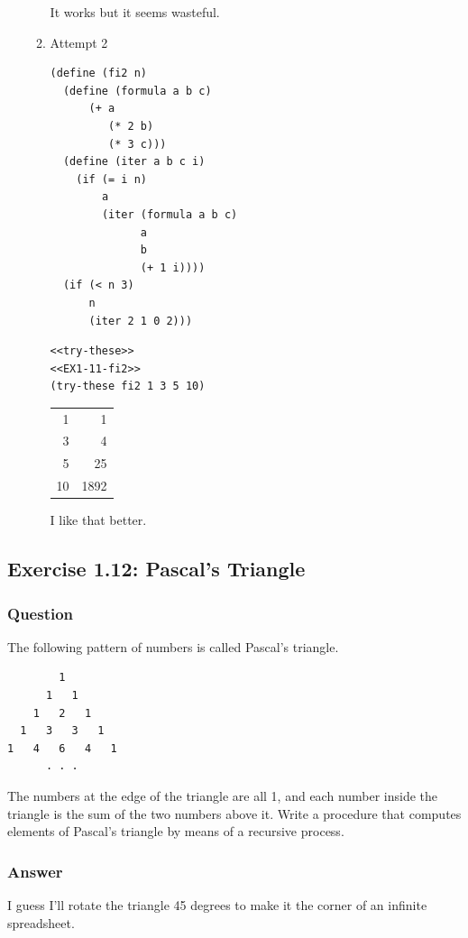 \documentclass[final,fleqn,titlepage,twoside]{article}
\begin{document}
\begin{enumerate}
\begin{enumerate}
It works but it seems wasteful.

\item Attempt 2
\label{sec:org024546f}
\begin{verbatim}
(define (fi2 n)
  (define (formula a b c)
      (+ a
         (* 2 b)
         (* 3 c)))
  (define (iter a b c i)
    (if (= i n)
        a
        (iter (formula a b c)
              a
              b
              (+ 1 i))))
  (if (< n 3)
      n
      (iter 2 1 0 2)))
\end{verbatim}

\begin{verbatim}
<<try-these>>
<<EX1-11-fi2>>
(try-these fi2 1 3 5 10)
\end{verbatim}

\begin{center}
\begin{tabular}{rr}
1 & 1\\[0pt]
3 & 4\\[0pt]
5 & 25\\[0pt]
10 & 1892\\[0pt]
\end{tabular}
\end{center}

I like that better.
\end{enumerate}
\end{enumerate}

\subsection{Exercise 1.12: Pascal's Triangle}
\label{sec:orge953811}
\subsubsection{Question}
\label{sec:org47ba487}
The following pattern of numbers is called Pascal's triangle.

\begin{verbatim}
        1
      1   1
    1   2   1
  1   3   3   1
1   4   6   4   1
      . . .
\end{verbatim}

The numbers at the edge of the triangle are all 1, and each number inside the
triangle is the sum of the two numbers above it. Write a procedure that
computes elements of Pascal's triangle by means of a recursive process.

\subsubsection{Answer}
\label{sec:org3a21113}
I guess I'll rotate the triangle 45 degrees to make it the corner of an
infinite spreadsheet.
\end{document}
